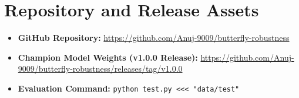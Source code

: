 \documentclass[10pt,journal,compsoc]{IEEEtran}
\begin{document}
\section{Repository and Release Assets}
\begin{itemize}
\item \textbf{GitHub Repository:} \href{https://github.com/Anuj-9009/butterfly-robustness}{https://github.com/Anuj-9009/butterfly-robustness}
\item \textbf{Champion Model Weights (v1.0.0 Release):} \href{https://github.com/Anuj-9009/butterfly-robustness/releases/tag/v1.0.0}{https://github.com/Anuj-9009/butterfly-robustness/releases/tag/v1.0.0}
\item \textbf{Evaluation Command:} \texttt{python test.py <<< "data/test"}
\end{itemize}
\end{document}
